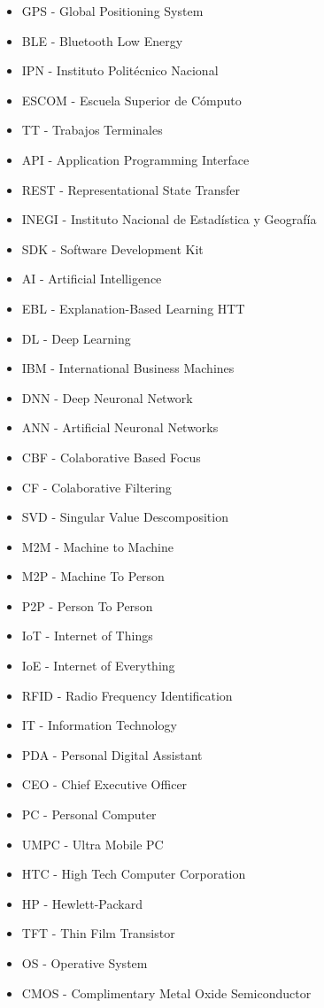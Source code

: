 \begin{itemize}
\item GPS - Global Positioning System
\item BLE - Bluetooth Low Energy
\item IPN - Instituto Politécnico Nacional
\item ESCOM - Escuela Superior de Cómputo
\item TT - Trabajos Terminales
\item API - Application Programming Interface
\item REST - Representational State Transfer
\item INEGI - Instituto Nacional de Estadística y Geografía
\item SDK - Software Development Kit
\item AI - Artificial Intelligence
\item EBL - Explanation-Based Learning
HTT
\item DL - Deep Learning
\item IBM - International Business Machines
\item DNN - Deep Neuronal Network
\item ANN - Artificial Neuronal Networks
\item CBF - Colaborative Based Focus
\item CF - Colaborative Filtering
\item SVD - Singular Value Descomposition
\item M2M - Machine to Machine
\item M2P - Machine To Person
\item P2P - Person To Person
\item IoT - Internet of Things
\item IoE - Internet of Everything
\item RFID - Radio Frequency Identification
\item IT - Information Technology
\item PDA - Personal Digital Assistant
\item CEO - Chief Executive Officer
\item PC - Personal Computer
\item UMPC - Ultra Mobile PC
\item HTC - High Tech Computer Corporation
\item HP - Hewlett-Packard
\item TFT - Thin Film Transistor
\item OS - Operative System
\item CMOS - Complimentary Metal Oxide Semiconductor

\end{itemize}

